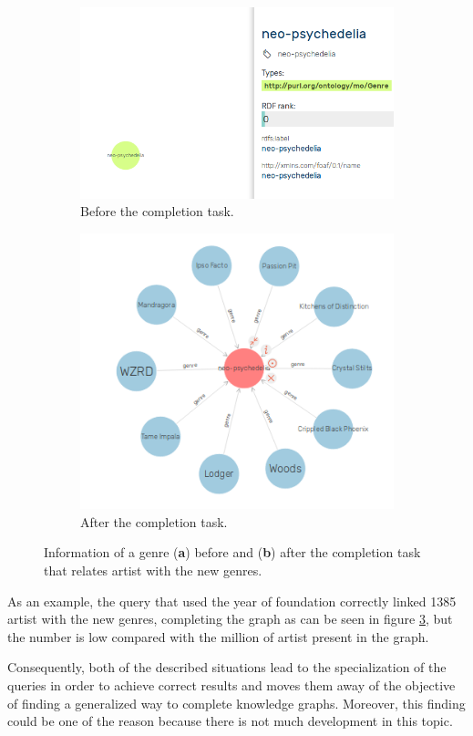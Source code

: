 \begin{figure}[!tbh]
	\centering
	\begin{subfigure}{\columnwidth}
		\centering
		\includegraphics[width=0.7\linewidth]{images/neo-psychedelia.png}
		\caption{Before the completion task.}
		\label{subfig:before}
	\end{subfigure}
	\begin{subfigure}{\columnwidth}
		\centering
		\includegraphics[width=0.63\linewidth]{images/neo-after.png}
		\caption{After the completion task.}
		\label{subfig:after}
	\end{subfigure}
	\caption{Information of a genre (\textbf{a}) before and (\textbf{b}) after the completion task that relates artist with the new genres.}
	\label{fig:completion}
\end{figure}

As an example, the query that used the year of foundation correctly linked 1385 artist with the new genres, completing the graph as can be seen in figure \ref{fig:completion}, but the number is low compared with the million of artist present in the graph. 

Consequently, both of the described situations lead to the specialization of the queries in order to achieve correct results and moves them away of the objective of finding a generalized way to complete knowledge graphs. Moreover, this finding could be one of the reason because there is not much development in this topic. 